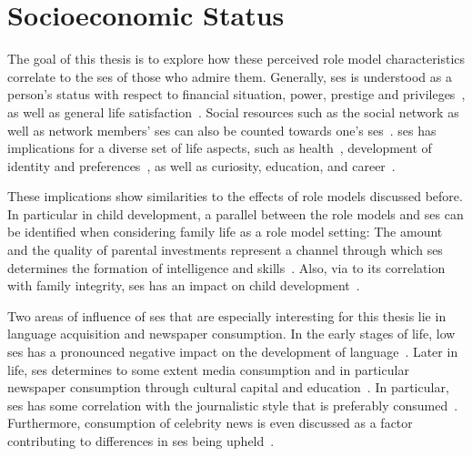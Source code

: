 \section{Socioeconomic Status}\label{ch:ses}
The goal of this thesis is to explore how these perceived role model characteristics correlate to the \gls{ses} of those who admire them. Generally, \gls{ses} is understood as a person's status with respect to financial situation, power, prestige and privileges~\autocite{mueller_measures_1981}, as well as general life satisfaction~\autocite{wagner_german_2007}. Social resources such as the social network as well as network members' \gls{ses} can also be counted towards one's \gls{ses}~\autocite{campbell_social_1986}. \gls{ses} has implications for a diverse set of life aspects, such as health~\autocite{oakes_measurement_2003, braveman_social_2011}, development of identity and preferences~\autocite{bradley_socioeconomic_2002, kraus_social_2012}, as well as curiosity, education, and career~\autocite{broer_review_2019,tucker-drob_socioeconomic_2012,walpole_socioeconomic_2003}. 

These implications show similarities to the effects of role models discussed before. In particular in child development, a parallel between the role models and \gls{ses} can be identified when considering family life as a role model setting: The amount and the quality of parental investments represent a channel through which \gls{ses} determines the formation of intelligence and skills~\autocite{cunha_technology_2007,falk_socioeconomic_2021,cobb-clark_parenting_2019}. Also, via to its correlation with family integrity, \gls{ses} has an impact on child development~\autocite{conger_socioeconomic_2010}.

Two areas of influence of \gls{ses} that are especially interesting for this thesis lie in language acquisition and newspaper consumption. In the early stages of life, low \gls{ses} has a pronounced negative impact on the development of language~\autocite{arriaga_scores_1998,hoff_socioeconomic_2005}. Later in life, \gls{ses} determines to some extent media consumption and in particular newspaper consumption through cultural capital and education~\autocite{york_youth_2015,lee_motivational_2014}. In particular, \gls{ses} has some correlation with the journalistic style that is preferably consumed~\autocite{ohlsson_matter_2017,bergstrom_towards_2019}. Furthermore, consumption of celebrity news is even discussed as a factor contributing to differences in \gls{ses} being upheld~\autocite{dubied_studying_2014}.


